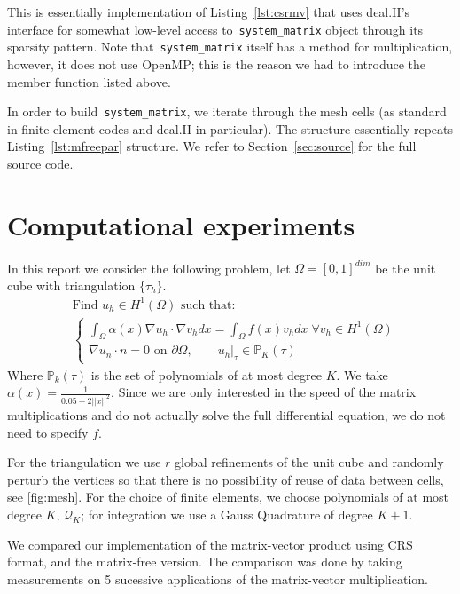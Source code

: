 \documentclass[12pt]{article}
\begin{document}
This is essentially implementation of Listing~\ref{lst:csrmv} that uses deal.II's interface for somewhat low-level access to~\texttt{system\_matrix} object through its sparsity pattern. Note that~\texttt{system\_matrix} itself has a method for multiplication, however, it does not use OpenMP; this is the reason we had to introduce the member function listed above.

In order to build~\texttt{system\_matrix}, we iterate through the mesh cells (as standard in finite element codes and deal.II in particular). The structure essentially repeats Listing~\ref{lst:mfreepar} structure. We refer to Section~\ref{sec:source} for the full source code. 

\section{Computational experiments}
In this report we consider the following problem, let $\Omega = [0, 1]^{dim}$ be the unit cube with triangulation $\{\tau_{h}\}$.
\begin{align*}
&\text{Find } u_{h} \in H^{1}(\Omega) \text{ such that: }  \\
&\begin{cases}
\int_{\Omega} \alpha(x) \nabla u_{h} \cdot \nabla v_{h} dx  = \int_{\Omega} f(x) v_{h} dx \; \forall v_{h} \in H^{1}(\Omega) \\
\nabla u_{n} \cdot n = 0 \text{ on } \partial \Omega ,\qquad u_{h} \vert_{\tau} \in \mathbb{P}_{K}(\tau) 
\end{cases}
\end{align*}
Where $\mathbb{P}_{k}(\tau) $ is the set of polynomials of at most degree $K$. We take $\alpha(x) = \frac{1}{0.05 + 2\vert \vert x \vert \vert^{2}}$. Since we are only interested in the speed of the matrix multiplications and do not actually solve the full differential equation, we do not need to specify $f$.

For the triangulation we use $r$ global refinements of the unit cube and randomly perturb the vertices so that there is no possibility of reuse of data between cells, see \ref{fig:mesh}. For the choice of finite elements, we choose polynomials of at most degree $K$, $\mathcal{Q}_{K}$; for integration we use a Gauss Quadrature of degree $K+1$. 

We compared our implementation of the matrix-vector product using CRS format, and the matrix-free version. The comparison was done by taking measurements on 5 sucessive applications of the matrix-vector multiplication.
\end{document}
